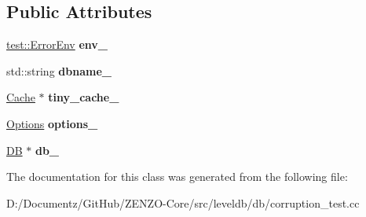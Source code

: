 \subsection*{Public Attributes}
\begin{DoxyCompactItemize}
\item 
\mbox{\label{classleveldb_1_1_corruption_test_a9ea05b88e4240ace348f542b43d59281}} 
\mbox{\hyperlink{classleveldb_1_1test_1_1_error_env}{test\+::\+Error\+Env}} {\bfseries env\+\_\+}
\item 
\mbox{\label{classleveldb_1_1_corruption_test_a533997a5fb977df165da8d92b6e9914a}} 
std\+::string {\bfseries dbname\+\_\+}
\item 
\mbox{\label{classleveldb_1_1_corruption_test_afc8ff2f272ee3da2756acc21c37750d5}} 
\mbox{\hyperlink{classleveldb_1_1_cache}{Cache}} $\ast$ {\bfseries tiny\+\_\+cache\+\_\+}
\item 
\mbox{\label{classleveldb_1_1_corruption_test_a6d639ef3ec7f1009447b85f9a10f90ac}} 
\mbox{\hyperlink{structleveldb_1_1_options}{Options}} {\bfseries options\+\_\+}
\item 
\mbox{\label{classleveldb_1_1_corruption_test_a8bfd06bc0008cddb00e9492648bfca79}} 
\mbox{\hyperlink{classleveldb_1_1_d_b}{DB}} $\ast$ {\bfseries db\+\_\+}
\end{DoxyCompactItemize}


The documentation for this class was generated from the following file\+:\begin{DoxyCompactItemize}
\item 
D\+:/\+Documentz/\+Git\+Hub/\+Z\+E\+N\+Z\+O-\/\+Core/src/leveldb/db/corruption\+\_\+test.\+cc\end{DoxyCompactItemize}

